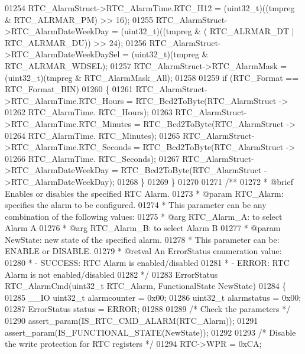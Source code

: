\begin{DoxyCode}
01254   RTC\_AlarmStruct->RTC_AlarmTime.RTC_H12 = (uint32\_t)((tmpreg & 
      RTC_ALRMAR_PM) >> 16);
01255   RTC\_AlarmStruct->RTC_AlarmDateWeekDay = (uint32\_t)((tmpreg & (
      RTC_ALRMAR_DT | RTC_ALRMAR_DU)) >> 24);
01256   RTC\_AlarmStruct->RTC_AlarmDateWeekDaySel = (uint32\_t)(tmpreg & 
      RTC_ALRMAR_WDSEL);
01257   RTC\_AlarmStruct->RTC_AlarmMask = (uint32\_t)(tmpreg & RTC_AlarmMask_All);
01258 
01259   \textcolor{keywordflow}{if} (RTC\_Format == RTC_Format_BIN)
01260   \{
01261     RTC\_AlarmStruct->RTC_AlarmTime.RTC_Hours = RTC_Bcd2ToByte(RTC\_AlarmStruct
      ->
01262                                                         RTC_AlarmTime.
      RTC_Hours);
01263     RTC\_AlarmStruct->RTC_AlarmTime.RTC_Minutes = RTC_Bcd2ToByte(RTC\_AlarmStruct
      ->
01264                                                         RTC_AlarmTime.
      RTC_Minutes);
01265     RTC\_AlarmStruct->RTC_AlarmTime.RTC_Seconds = RTC_Bcd2ToByte(RTC\_AlarmStruct
      ->
01266                                                         RTC_AlarmTime.
      RTC_Seconds);
01267     RTC\_AlarmStruct->RTC_AlarmDateWeekDay = RTC_Bcd2ToByte(RTC\_AlarmStruct
      ->RTC_AlarmDateWeekDay);
01268   \}
01269 \}
01270 
01271 \textcolor{comment}{/**}
01272 \textcolor{comment}{  * @brief  Enables or disables the specified RTC Alarm.}
01273 \textcolor{comment}{  * @param  RTC\_Alarm: specifies the alarm to be configured.}
01274 \textcolor{comment}{  *          This parameter can be any combination of the following values:}
01275 \textcolor{comment}{  *            @arg RTC\_Alarm\_A: to select Alarm A}
01276 \textcolor{comment}{  *            @arg RTC\_Alarm\_B: to select Alarm B  }
01277 \textcolor{comment}{  * @param  NewState: new state of the specified alarm.}
01278 \textcolor{comment}{  *          This parameter can be: ENABLE or DISABLE.}
01279 \textcolor{comment}{  * @retval An ErrorStatus enumeration value:}
01280 \textcolor{comment}{  *          - SUCCESS: RTC Alarm is enabled/disabled}
01281 \textcolor{comment}{  *          - ERROR: RTC Alarm is not enabled/disabled  }
01282 \textcolor{comment}{  */}
01283 ErrorStatus RTC_AlarmCmd(uint32\_t RTC\_Alarm, FunctionalState NewState)
01284 \{
01285   \_\_IO uint32\_t alarmcounter = 0x00;
01286   uint32\_t alarmstatus = 0x00;
01287   ErrorStatus status = ERROR;
01288 
01289   \textcolor{comment}{/* Check the parameters */}
01290   assert_param(IS\_RTC\_CMD\_ALARM(RTC\_Alarm));
01291   assert_param(IS\_FUNCTIONAL\_STATE(NewState));
01292 
01293   \textcolor{comment}{/* Disable the write protection for RTC registers */}
01294   RTC->WPR = 0xCA;

\end{DoxyCode}
